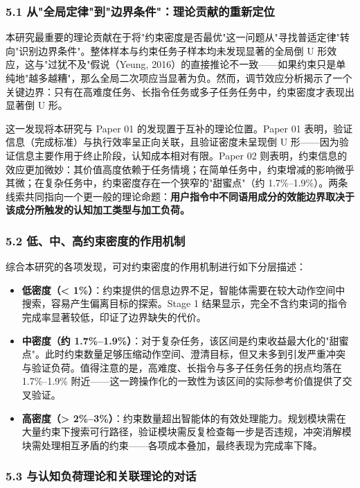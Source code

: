 \documentclass[12pt,a4paper,openany,oneside]{ctexrep}
\begin{document}
\subsubsection{5.1 从"全局定律"到"边界条件"：理论贡献的重新定位}


本研究最重要的理论贡献在于将"约束密度是否最优"这一问题从"寻找普适定律"转向"识别边界条件"。整体样本与约束任务子样本均未发现显著的全局倒 U 形效应，这与"过犹不及"假说（Yeung, 2016）的直接推论不一致——如果约束只是单纯地"越多越糟"，那么全局二次项应当显著为负。然而，调节效应分析揭示了一个关键边界：只有在高难度任务、长指令任务或多子任务任务中，约束密度才表现出显著倒 U 形。

这一发现将本研究与 Paper 01 的发现置于互补的理论位置。Paper 01 表明，验证信息（完成标准）与执行效率呈正向关联，且验证密度未呈现倒 U 形——因为验证信息主要作用于终止阶段，认知成本相对有限。Paper 02 则表明，约束信息的效应更加微妙：其价值高度依赖于任务情境；在简单任务中，约束增减的影响微乎其微；在复杂任务中，约束密度存在一个狭窄的"甜蜜点"（约 1.7\%–1.9\%）。两条线索共同指向一个更一般的理论命题：\textbf{用户指令中不同语用成分的效能边界取决于该成分所触发的认知加工类型与加工负荷。}

\subsubsection{5.2 低、中、高约束密度的作用机制}


综合本研究的各项发现，可对约束密度的作用机制进行如下分层描述：

\begin{itemize}
\item \textbf{低密度（< 1\%）}：约束提供的信息边界不足，智能体需要在较大动作空间中搜索，容易产生偏离目标的探索。Stage 1 结果显示，完全不含约束词的指令完成率显著较低，印证了边界缺失的代价。
\item \textbf{中密度（约 1.7\%–1.9\%）}：对于复杂任务，该区间是约束收益最大化的"甜蜜点"。此时约束数量足够压缩动作空间、澄清目标，但又未多到引发严重冲突与验证负荷。值得注意的是，高难度、长指令与多子任务任务的拐点均落在 1.7\%–1.9\% 附近——这一跨操作化的一致性为该区间的实际参考价值提供了交叉验证。
\item \textbf{高密度（> 2\%–3\%）}：约束数量超出智能体的有效处理能力。规划模块需在大量约束下搜索可行路径，验证模块需反复检查每一步是否违规，冲突消解模块需处理相互矛盾的约束——各项成本叠加，最终表现为完成率下降。
\end{itemize}


\subsubsection{5.3 与认知负荷理论和关联理论的对话}
\end{document}
